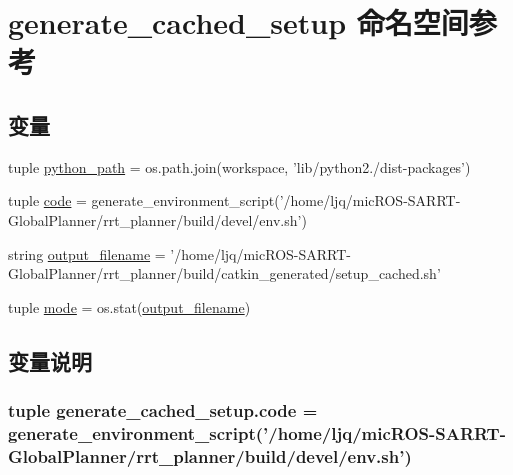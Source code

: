 \hypertarget{namespacegenerate__cached__setup}{\section{generate\-\_\-cached\-\_\-setup 命名空间参考}
\label{namespacegenerate__cached__setup}
}
\subsection*{变量}
\begin{DoxyCompactItemize}
\item 
tuple \hyperlink{namespacegenerate__cached__setup_a770288702e38f06cf1b86a33bc07723e}{python\-\_\-path} = os.\-path.\-join(workspace, 'lib/python2./dist-\/packages')
\item 
tuple \hyperlink{namespacegenerate__cached__setup_a4ed71aac3acd6cda6640f912559b5408}{code} = generate\-\_\-environment\-\_\-script('/home/ljq/mic\-R\-O\-S-\/S\-A\-R\-R\-T-\/Global\-Planner/rrt\-\_\-planner/build/devel/env.\-sh')
\item 
string \hyperlink{namespacegenerate__cached__setup_a0265aee5075ee1eb701ff69c98ad6793}{output\-\_\-filename} = '/home/ljq/mic\-R\-O\-S-\/S\-A\-R\-R\-T-\/Global\-Planner/rrt\-\_\-planner/build/catkin\-\_\-generated/setup\-\_\-cached.\-sh'
\item 
tuple \hyperlink{namespacegenerate__cached__setup_afd1a431f16a2a78ef0438a658e4ac3cf}{mode} = os.\-stat(\hyperlink{namespacegenerate__cached__setup_a0265aee5075ee1eb701ff69c98ad6793}{output\-\_\-filename})
\end{DoxyCompactItemize}


\subsection{变量说明}
\hypertarget{namespacegenerate__cached__setup_a4ed71aac3acd6cda6640f912559b5408}{
\subsubsection[{code}]{\setlength{\rightskip}{0pt plus 5cm}tuple generate\-\_\-cached\-\_\-setup.\-code = generate\-\_\-environment\-\_\-script('/home/ljq/mic\-R\-O\-S-\/S\-A\-R\-R\-T-\/Global\-Planner/rrt\-\_\-planner/build/devel/env.\-sh')}}\label{namespacegenerate__cached__setup_a4ed71aac3acd6cda6640f912559b5408}


